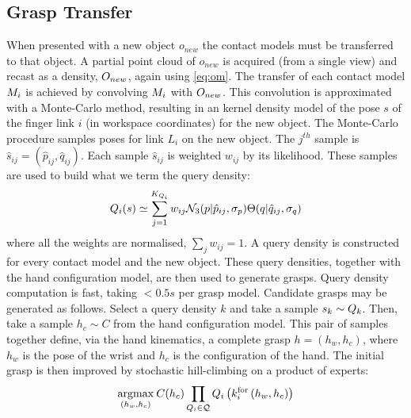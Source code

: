 \subsection{Grasp Transfer}
When presented with a new object $o_{new}$ the contact models must be transferred to that object. A partial point cloud of $o_{new}$ is acquired (from a single view) and recast as a density, $O_{new}$, again using \eq \ref{eq:om}. The transfer of each contact model $M_i$ is achieved by convolving $M_i$ with $O_{new}$. This convolution is approximated with a Monte-Carlo method, resulting in an kernel density model of the pose $s$ of the finger link $i$ (in workspace coordinates) for the new object. The Monte-Carlo procedure samples poses for link $L_i$ on the new object. The $j^{th}$ sample is $\hat{s}_{ij}=(\hat{p}_{ij},\hat{q}_{ij})$. Each sample $\hat{s}_{ij}$ is weighted $w_{ij}$ by its likelihood. These samples are used to build what we term the query density:
\begin{equation}
\qd_i(s) \simeq \sum^{K_{Q_i}}_{j=1} w_{ij} \mathcal{N}_3(p|{\hat{p}_{ij}}, \sigma_{p}) \Theta(q|{\hat{q}_{ij}}, \sigma_{q})%
\label{eq:qd.approx}
\end{equation}
where all the weights are normalised, $\sum_j w_{ij} = 1$. A query density is constructed for every contact model and the new object. These query densities, together with the hand configuration model, are then used to generate grasps. Query density computation is fast, taking $<0.5s$  per grasp model.
Candidate grasps may be generated as follows. Select a query density $k$ and take a sample  $s_k \sim Q_{k}$. Then, take a sample $h_c \sim C$ from the hand configuration model. This pair of samples together define, via the hand kinematics, a complete grasp $h=(h_w,h_c)$, where $h_w$ is the pose of the wrist and $h_c$ is the configuration of the hand. The initial grasp is then improved by stochastic hill-climbing on a product of experts:
\begin{equation}
\argmax{(h_w, h_c)} \hc(h_c) \prod_{\qd_i \in \mathcal{Q}} \qd_i\left(k_{i}^{\mathrm{for}}\left(h_w, h_c\right)\right)
\label{eq:grasping.product}
\end{equation}
